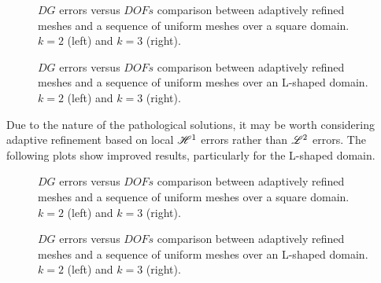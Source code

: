 \begin{figure}[!ht]
	\begin{subfigure}[b]{0.45\textwidth}
		
	\end{subfigure}
	\hfill
	\begin{subfigure}[b]{0.45\textwidth}
		
	\end{subfigure}
    \caption{$DG$ errors versus $DOFs$ comparison between adaptively refined meshes and a sequence of uniform meshes over a square domain. $k = 2$ (left) and $k = 3$ (right).}
\end{figure}

\begin{figure}[!ht]
	\begin{subfigure}[b]{0.45\textwidth}
		
	\end{subfigure}
	\hfill
	\begin{subfigure}[b]{0.45\textwidth}
		
	\end{subfigure}
    \caption{$DG$ errors versus $DOFs$ comparison between adaptively refined meshes and a sequence of uniform meshes over an L-shaped domain. $k = 2$ (left) and $k = 3$ (right).}
\end{figure}

\newpage

Due to the nature of the pathological solutions, it may be worth considering adaptive refinement based on local $\mathscr{H}^1$ errors rather than $\mathscr{L}^2$ errors. The following plots show improved results, particularly for the L-shaped domain.

\begin{figure}[!ht]
	\begin{subfigure}[b]{0.45\textwidth}
		
	\end{subfigure}
	\hfill
	\begin{subfigure}[b]{0.45\textwidth}
		
	\end{subfigure}
    \caption{$DG$ errors versus $DOFs$ comparison between adaptively refined meshes and a sequence of uniform meshes over a square domain. $k = 2$ (left) and $k = 3$ (right).}
\end{figure}

\begin{figure}[!ht]
	\begin{subfigure}[b]{0.45\textwidth}
		
	\end{subfigure}
	\hfill
	\begin{subfigure}[b]{0.45\textwidth}
	\end{subfigure}
    \caption{$DG$ errors versus $DOFs$ comparison between adaptively refined meshes and a sequence of uniform meshes over an L-shaped domain. $k = 2$ (left) and $k = 3$ (right).}
\end{figure}


